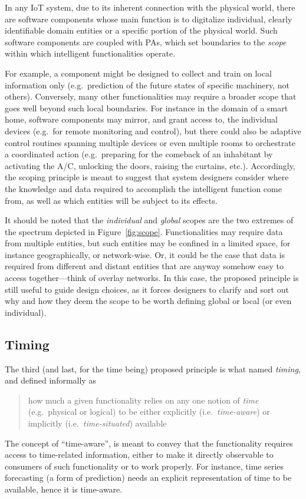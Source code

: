 In any IoT system, due to its inherent connection with the physical world, there are software components whose main function 
is to digitalize individual, clearly identifiable domain entities or a specific portion of the physical world. 
Such software components 
are coupled with PAs, which set boundaries to the \emph{scope} within which intelligent functionalities operate. 

For example, a component might be designed to collect and train on local information only (e.g.\ prediction of the future states of specific machinery, not others). 
%
Conversely, many other functionalities may require a broader scope that goes well beyond such local boundaries. 
For instance in the domain of a smart home,
software components may mirror, and grant access to, the individual devices (e.g.\ for remote monitoring and control), 
but there could also be adaptive control routines spanning multiple devices or even multiple rooms to orchestrate a coordinated action (e.g.\ preparing for the comeback of an inhabitant by activating the A/C, unlocking the doors, raising the curtains, etc.). 
%
Accordingly, the scoping principle is meant to suggest that system designers consider where the knowledge and data required to accomplish the intelligent function come from, as well as which entities will be subject to its effects. 

It should be noted that the \emph{individual} and \emph{global} scopes are the two extremes of the spectrum depicted in Figure~\ref{fig:scope}. 
Functionalities may require data from multiple entities, but such entities may be confined in a limited space, for instance geographically, or network-wise. 
Or, it could be the case that data is required from different and distant entities that are anyway somehow easy to access together---think of overlay networks. 
%
In this case, the proposed principle is still useful to guide design choices, as it forces designers to clarify and sort out why and how they deem the scope to be worth defining global or local (or even individual). 

\subsection{Timing} 

The third (and last, for the time being) proposed principle is what named \emph{timing}, and defined informally as 
\begin{quote}
    how much a given functionality relies on any one notion of \emph{time} (e.g.\ physical or logical) to be either explicitly (i.e.\ \emph{time-aware}) or implicitly (i.e.\ \emph{time-situated}) available
\end{quote}
%
The concept of ``time-aware'', is meant to convey that the functionality requires access to time-related information, either to make it directly observable to consumers of such functionality or to work properly. 
For instance, time series forecasting (a form of prediction) needs an explicit representation of time to be available, hence it is time-aware. 

